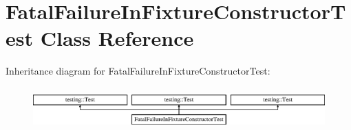 \hypertarget{class_fatal_failure_in_fixture_constructor_test}{}\section{Fatal\+Failure\+In\+Fixture\+Constructor\+Test Class Reference}
\label{class_fatal_failure_in_fixture_constructor_test}
Inheritance diagram for Fatal\+Failure\+In\+Fixture\+Constructor\+Test\+:\begin{figure}[H]
\begin{center}
\leavevmode
\includegraphics[height=1.651917cm]{d0/d41/class_fatal_failure_in_fixture_constructor_test}
\end{center}
\end{figure}
